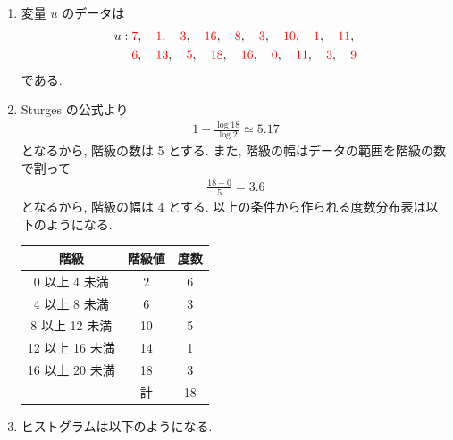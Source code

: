 \vspace{\baselineskip}
\stepup
\begin{qenumerate}
	\item{
		\begin{enumerate}
			\item{
				変量 $u$ のデータは
				\begin{align}
					u: \textcolor{red}{7}&, \quad \textcolor{red}{1}, \quad \textcolor{red}{3}, \quad \textcolor{red}{16}, \quad \textcolor{red}{8}, \quad \textcolor{red}{3}, \quad \textcolor{red}{10}, \quad \textcolor{red}{1}, \quad \textcolor{red}{11}, \\
						 \textcolor{red}{6}&, \quad \textcolor{red}{13}, \quad \textcolor{red}{5}, \quad \textcolor{red}{18}, \quad \textcolor{red}{16}, \quad \textcolor{red}{0}, \quad \textcolor{red}{11}, \quad \textcolor{red}{3}, \quad \textcolor{red}{9}
				\end{align}
				である.
			}
			\item{
				Sturges の公式より
				\begin{align}
					1 + \frac{\log{18}}{\log{2}} \simeq 5.17
				\end{align}
				となるから, 階級の数は 5 とする.
				また, 階級の幅はデータの範囲を階級の数で割って
				\begin{align}
					\frac{18 - 0}{5} = 3.6
				\end{align}
				となるから, 階級の幅は 4 とする.
				以上の条件から作られる度数分布表は以下のようになる.
				\begin{table}[H]
					\centering
					\begin{tabular}{c|c|c} \hline
						階級 & 階級値 & 度数 \\ \hline
						0 以上 4 未満   & 2 & 6 \\
						4 以上 8 未満   &  6 & 3 \\
						8 以上 12 未満  & 10 & 5 \\
						12 以上 16 未満 & 14 & 1 \\
						16 以上 20 未満 & 18 & 3 \\ \hline
						               & 計 & 18 \\ \hline
					\end{tabular}
				\end{table}
			}
			\item{
				ヒストグラムは以下のようになる.
				\begin{figure}[H]
					\centering

\end{figure}}
\end{enumerate}}
\end{qenumerate}
